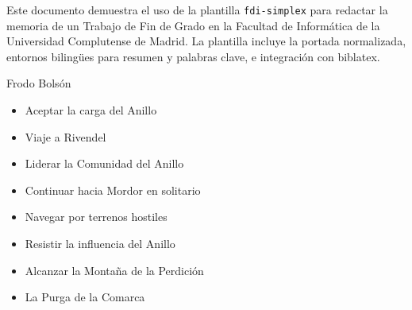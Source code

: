 \documentclass[tfg,estilo=digital,portada=normativa]{fdi-simplex}
\begin{document}
\makeportada

\frontmatter

\begin{resumen}
Este documento demuestra el uso de la plantilla \texttt{fdi-simplex}
para redactar la memoria de un Trabajo de Fin de Grado en la
Facultad de Informática de la Universidad Complutense de Madrid. La
plantilla incluye la portada normalizada, entornos bilingües para
resumen y palabras clave, e integración con biblatex.
\end{resumen}

\begin{abstract}
This document demonstrates the \texttt{fdi-simplex} template for
writing the report of a Bachelor's Thesis at the Faculty of
Computer Science of the Complutense University of Madrid. The
template provides a normalized cover page, bilingual abstract and
keyword environments, and biblatex integration.
\end{abstract}

\tableofcontents

\mainmatter







\backmatter

\begin{contribucion}{Frodo Bolsón}
\begin{itemize}
\item Aceptar la carga del Anillo
\item Viaje a Rivendel
\item Liderar la Comunidad del Anillo
\item Continuar hacia Mordor en solitario
\item Navegar por terrenos hostiles
\item Resistir la influencia del Anillo
\item Alcanzar la Montaña de la Perdición
\item La Purga de la Comarca
\end{itemize}
\end{contribucion}
\end{document}
